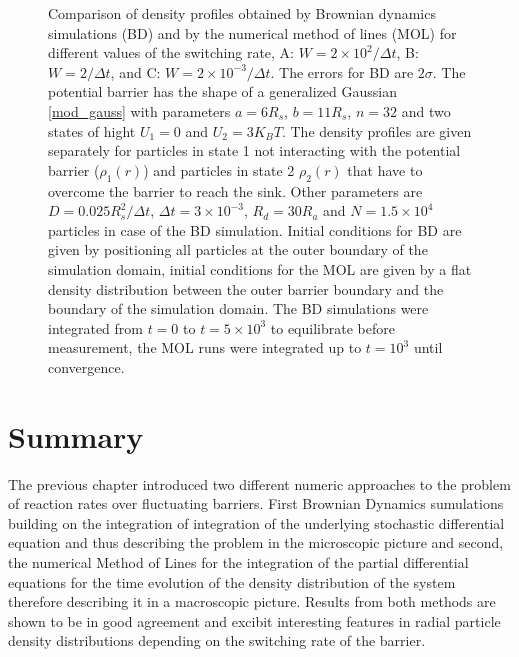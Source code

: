 \begin{minipage}[t]{.66 \textwidth}
\begin{figure}[H]
    \end{figure}
\end{minipage}\hspace{-0.2 cm}\begin{minipage}[t]{.37 \textwidth}
    \begin{figure}[H]
        \caption{Comparison of density profiles obtained by Brownian dynamics simulations (BD) and by the numerical method of lines (MOL) for different values of the switching rate, A: $W=2 \times 10^{2}/\Delta t$, B: $W=2/\Delta t$, and C: $W=2 \times 10^{-3}/\Delta t$. The errors for BD are $2 \sigma$. The potential barrier has the shape of a generalized Gaussian \eqref{mod_gauss} with parameters $a = 6 R_s$, $b = 11 R_s$, $n = 32$ and two states of hight $U_1 = 0$ and $U_2 = 3 K_B T$. The density profiles are given separately for particles in state 1 not interacting with the potential barrier ($\rho_1(r)$) and particles in state 2 $\rho_2(r)$ that have to overcome the barrier to reach the sink. Other parameters are $D = 0.025 R_s^2/\Delta t$, $\Delta t = 3 \times 10^{-3}$, $R_d = 30 R_a$ and $N = 1.5\times 10^{4}$ particles in case of the BD simulation. Initial conditions for BD are given by positioning all particles at the outer boundary of the simulation domain, initial conditions for the MOL  are given by a flat density distribution between the outer barrier boundary and the boundary of the simulation domain. The BD simulations were integrated from $t=0$ to $t=5 \times 10^3$ to equilibrate before measurement, the MOL runs were integrated up to $t = 10^{3}$ until convergence.\label{Rho_numeric}} 
    \end{figure}
\end{minipage}
\section{Summary}
The previous chapter introduced two different numeric approaches to the problem of reaction rates over fluctuating barriers. First Brownian Dynamics sumulations building on the integration of integration of the underlying stochastic differential equation and thus describing the problem in the microscopic picture and second, the numerical Method of Lines for the integration of the partial differential equations for the time evolution of the density distribution of the system therefore describing it in a macroscopic picture. Results from both methods are shown to be in good agreement and excibit interesting features in radial particle density distributions depending on the switching rate of the barrier.


